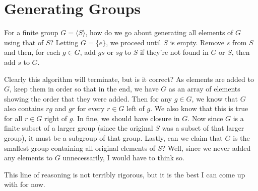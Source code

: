 \documentclass[12pt]{article}
\begin{document}
\section*{Generating Groups}

For a finite group $G=\langle S\rangle$, how do we go about generating all elements of $G$ using that of $S$?
Letting $G=\{e\}$, we proceed until $S$ is empty.  Remove $s$ from $S$ and then, for each $g\in G$,
add $gs$ or $sg$ to $S$ if they're not found in $G$ or $S$, then add $s$ to $G$.

Clearly this algorithm will terminate, but is it correct?  As elements are added to $G$, keep them in order so
that in the end, we have $G$ as an array of elements showing the order that they were added.  Then for any $g\in G$,
we know that $G$ also contains $rg$ and $gr$ for every $r\in G$ left of $g$.  We also know that this is true for
all $r\in G$ right of $g$.  In fine, we should have closure in $G$.  Now since $G$ is a finite subset of a larger group (since
the original $S$ was a subset of that larger group),
it must be a subgroup of that group.  Lastly, can we claim that $G$ is the smallest group containing all original elements of $S$?
Well, since we never added any elements to $G$ unnecessarily, I would have to think so.

This line of reasoning is not terribly rigorous, but it is the best I can come up with for now.
\end{document}
